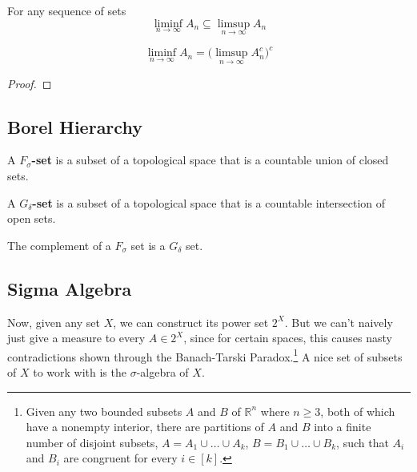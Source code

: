   \begin{lemma}[Monotonicity]
    For any sequence of sets 
    \begin{equation}
      \liminf_{n \to \infty} A_n \subseteq \limsup_{n \to \infty} A_n 
    \end{equation}
  \end{lemma}

  \begin{lemma}[Complements]
    \begin{equation}
      \liminf_{n \to \infty} A_n = \bigg( \limsup_{n \to \infty} A_n^c  \bigg)^c
    \end{equation}
  \end{lemma}
  \begin{proof}
    
  \end{proof}

  \begin{definition}
    
  \end{definition} 

\subsection{Borel Hierarchy}

  \begin{definition}
    A \textbf{$F_\sigma$-set} is a subset of a topological space that is a countable union of closed sets. 
  \end{definition}

  \begin{definition}
    A \textbf{$G_\delta$-set} is a subset of a topological space  that is a countable intersection of open sets. 
  \end{definition}

  \begin{lemma}
    The complement of a $F_\sigma$ set is a $G_\delta$ set. 
  \end{lemma} 

\subsection{Sigma Algebra}

  Now, given any set $X$, we can construct its power set $2^X$. But we can't naively just give a measure to every $A \in 2^X$, since for certain spaces, this causes nasty contradictions shown through the Banach-Tarski Paradox.\footnote{Given any two bounded subsets $A$ and $B$ of $\mathbb{R}^n$ where $n \geq 3$, both of which have a nonempty interior, there are partitions of $A$ and $B$ into a finite number of disjoint subsets, $A = A_1 \cup \ldots \cup A_k$, $B = B_1 \cup \ldots \cup B_k$, such that $A_i$ and $B_i$ are congruent for every $i \in [k]$.} A nice set of subsets of $X$ to work with is the $\sigma$-algebra of $X$. 


